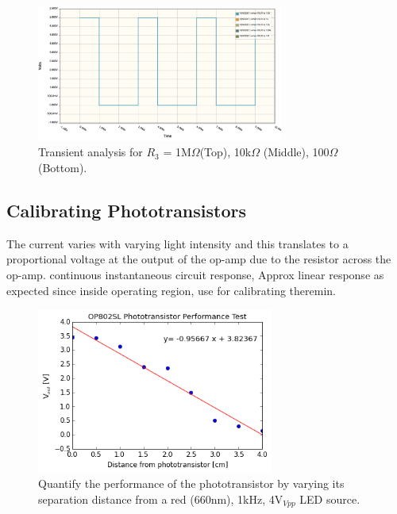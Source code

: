 \documentclass[twocolumn]{article}
\begin{document}
\begin{figure}[h!]
 \centering
   \includegraphics[width=230pt]{figure/sim_100.png}
\caption{Transient analysis for $R_3$ = 1M$\Omega$(Top), 10k$\Omega$ (Middle), 100$\Omega$ (Bottom).}
\label{sim_vco_r3}
\end{figure}
\newpage
\subsection{Calibrating Phototransistors\label{photo}} 
\par The current varies with varying light intensity and this translates to a proportional voltage at the output of the op-amp due to the resistor across the op-amp.   continuous instantaneous circuit response,
Approx linear response as expected since inside operating region, use for calibrating theremin. 
\begin{figure}[h!]
 \centering
 \includegraphics[width=220pt]{figure/phototransistor_performance}
\caption{Quantify the performance of the phototransistor by varying its separation distance from a red (660nm), 1kHz, 4V$_{Vpp}$ LED source.}
\label{phototransistor_performance}
\end{figure}
\end{document}
